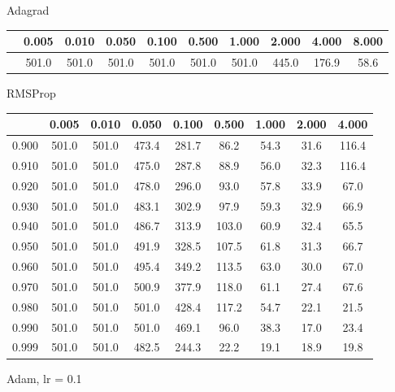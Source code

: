 \documentclass[a4paper,14pt,oneside,openany]{memoir}
\begin{document}
	Adagrad 
	
	\begin{tabular}{|c|c|c|c|c|c|c|c|c|c|}
	\hline 
	 &0.005 &0.010 &0.050 &0.100 &0.500 &1.000 &2.000 &4.000 &8.000 \\
	 \hline 
	 &501.0 &501.0 &501.0 &501.0 &501.0 &501.0 &445.0 &176.9 &58.6 \\
	 \hline 
	
	\end{tabular}
	
	RMSProp 
	
	\begin{tabular}{|c|c|c|c|c|c|c|c|c|}
	\hline 
	 &0.005 &0.010 &0.050 &0.100 &0.500 &1.000 &2.000 &4.000 \\
	 \hline 
	0.900 &501.0 &501.0 &473.4 &281.7 &86.2 &54.3 &31.6 &116.4 \\
	 \hline 
	0.910 &501.0 &501.0 &475.0 &287.8 &88.9 &56.0 &32.3 &116.4 \\
	 \hline 
	0.920 &501.0 &501.0 &478.0 &296.0 &93.0 &57.8 &33.9 &67.0 \\
	 \hline 
	0.930 &501.0 &501.0 &483.1 &302.9 &97.9 &59.3 &32.9 &66.9 \\
	 \hline 
	0.940 &501.0 &501.0 &486.7 &313.9 &103.0 &60.9 &32.4 &65.5 \\
	 \hline 
	0.950 &501.0 &501.0 &491.9 &328.5 &107.5 &61.8 &31.3 &66.7 \\
	 \hline 
	0.960 &501.0 &501.0 &495.4 &349.2 &113.5 &63.0 &30.0 &67.0 \\
	 \hline 
	0.970 &501.0 &501.0 &500.9 &377.9 &118.0 &61.1 &27.4 &67.6 \\
	 \hline 
	0.980 &501.0 &501.0 &501.0 &428.4 &117.2 &54.7 &22.1 &21.5 \\
	 \hline 
	0.990 &501.0 &501.0 &501.0 &469.1 &96.0 &38.3 &17.0 &23.4 \\
	 \hline 
	0.999 &501.0 &501.0 &482.5 &244.3 &22.2 &19.1 &18.9 &19.8 \\
	 \hline 
	
	\end{tabular}
	
	Adam, lr = 0.1 
	
\end{document}
